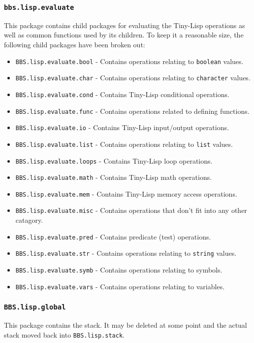 \documentclass[10pt, openany]{book}
\newcommand{\package}[1]{\texttt{#1}}
\newcommand{\datatype}[1]{\texttt{#1}}
\newcommand{\tl}{Tiny-Lisp}
\begin{document}
\subsubsection{\package{bbs.lisp.evaluate}}
This package contains child packages for evaluating the \tl{} operations as well as common functions used by its children.  To keep it a reasonable size, the following child packages have been broken out:
\begin{itemize}
  \item \package{BBS.lisp.evaluate.bool} - Contains operations relating to \datatype{boolean} values.
  \item \package{BBS.lisp.evaluate.char} - Contains operations relating to \datatype{character} values.
  \item \package{BBS.lisp.evaluate.cond} - Contains \tl{} conditional operations.
  \item \package{BBS.lisp.evaluate.func} - Contains operations related to defining functions.
  \item \package{BBS.lisp.evaluate.io} - Contains \tl{} input/output operations.
  \item \package{BBS.lisp.evaluate.list} - Contains operations relating to \datatype{list} values.
  \item \package{BBS.lisp.evaluate.loops} - Contains \tl{} loop operations.
  \item \package{BBS.lisp.evaluate.math} - Contains \tl{} math operations.
  \item \package{BBS.lisp.evaluate.mem} - Contains \tl{} memory access operations.
  \item \package{BBS.lisp.evaluate.misc} - Contains operations that don't fit into any other catagory.
  \item \package{BBS.lisp.evaluate.pred} - Contains predicate (test) operations.
  \item \package{BBS.lisp.evaluate.str} - Contains operations relating to \datatype{string} values.
  \item \package{BBS.lisp.evaluate.symb} - Contains operations relating to symbols.
  \item \package{BBS.lisp.evaluate.vars} - Contains operations relating to variables.
\end{itemize}

\subsubsection{\package{BBS.lisp.global}}
This package contains the stack.  It may be deleted at some point and the actual stack moved back into \package{BBS.lisp.stack}.
\end{document}
